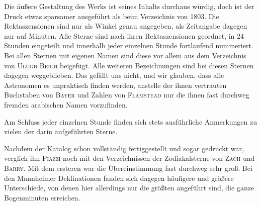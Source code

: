 Die äußere Gestaltung des Werks ist seines Inhalts durchaus würdig, doch ist der Druck etwas sparsamer ausgeführt als beim Verzeichnis von 1803. Die Rektaszensionen sind nur als Winkel genau angegeben, als Zeitangabe dagegen nur auf Minuten. Alle Sterne sind nach ihren Rektaszensionen geordnet, in 24 Stunden eingeteilt und innerhalb jeder einzelnen Stunde fortlaufend nummeriert. Bei allen Sternen mit eigenen Namen sind diese vor allem aus dem Verzeichnis von \textsc{Ulugh Beigh} beigefügt. Alle weiteren Bezeichnungen sind bei diesen Sternen dagegen weggeblieben. Das gefällt uns nicht, und wir glauben, dass alle Astronomen es unpraktisch finden werden, anstelle der ihnen vertrauten Buchstaben von \textsc{Bayer} und Zahlen von \textsc{Flamstead} nur die ihnen fast durchweg fremden arabischen Namen vorzufinden.

Am Schluss jeder einzelnen Stunde finden sich stets ausführliche Anmerkungen zu vielen der darin aufgeführten Sterne.

Nachdem der Katalog schon vollständig fertiggestellt und sogar gedruckt war, verglich ihn \textsc{Piazzi} noch mit den Verzeichnissen der Zodiakalsterne von \textsc{Zach} und \textsc{Barry}. Mit dem ersteren war die Übereinstimmung fast durchweg sehr groß. Bei den Mannheimer Deklinationen fanden sich dagegen häufigere und größere Unterschiede, von denen hier allerdings nur die größten angeführt sind, die ganze Bogenminuten erreichen.

